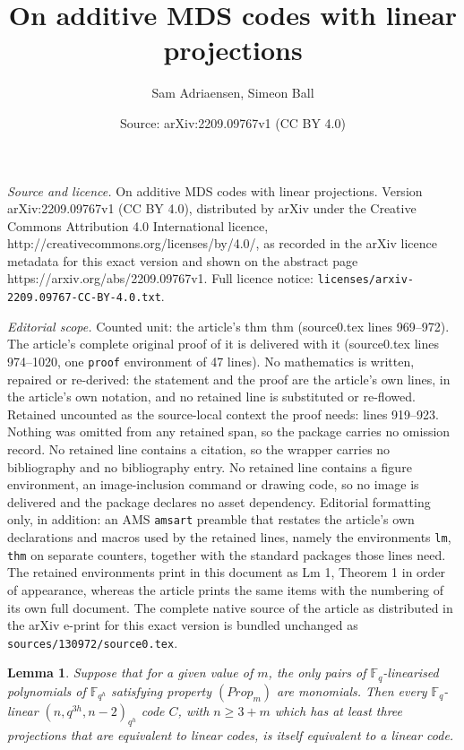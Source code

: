 \documentclass[10pt,a4paper]{amsart}
\title{On additive MDS codes with linear projections}
\author{Sam Adriaensen, Simeon Ball}
\date{Source: arXiv:2209.09767v1 (CC BY 4.0)}
\newtheorem{lm}{Lemma}
\newcommand{\FF}{\mathbb F}
\begin{document}
\maketitle

\noindent\emph{Source and licence.} On additive MDS codes with linear projections. Version arXiv:2209.09767v1 (CC BY 4.0), distributed by arXiv under the Creative Commons Attribution 4.0 International licence, http://creativecommons.org/licenses/by/4.0/, as recorded in the arXiv licence metadata for this exact version and shown on the abstract page https://arxiv.org/abs/2209.09767v1. Full licence notice: \texttt{licenses/arxiv-2209.09767-CC-BY-4.0.txt}.\par\smallskip

\noindent\textit{Editorial scope.} Counted unit: the article's thm thm (source0.tex lines 969--972). The article's complete original proof of it is delivered with it (source0.tex lines 974--1020, one \texttt{proof} environment of 47 lines). No mathematics is written, repaired or re-derived: the statement and the proof are the article's own lines, in the article's own notation, and no retained line is substituted or re-flowed.  Retained uncounted as the source-local context the proof needs: lines 919--923.  Nothing was omitted from any retained span, so the package carries no omission record.  No retained line contains a citation, so the wrapper carries no bibliography and no bibliography entry.  No retained line contains a figure environment, an image-inclusion command or drawing code, so no image is delivered and the package declares no asset dependency.  Editorial formatting only, in addition: an AMS \texttt{amsart} preamble that restates the article's own declarations and macros used by the retained lines, namely the environments \texttt{lm}, \texttt{thm} on separate counters, together with the standard packages those lines need.  The retained environments print in this document as Lm 1, Theorem 1 in order of appearance, whereas the article prints the same items with the numbering of its own full document.  The complete native source of the article as distributed in the arXiv e-print for this exact version is bundled unchanged as \texttt{sources/130972/source0.tex}.
\begin{lm}
 \label{LmProp}
 Suppose that for a given value of $m$, the only pairs of $\FF_q$-linearised polynomials of $\FF_{q^h}$ satisfying property $(Prop_m)$ are monomials.
 Then every $\FF_q$-linear $(n,q^{3h},n-2)_{q^h}$ code $C$, with $n \geq 3 + m$ which has at least three projections that are equivalent to linear codes, is itself equivalent to a linear code.
\end{lm}
\end{document}
